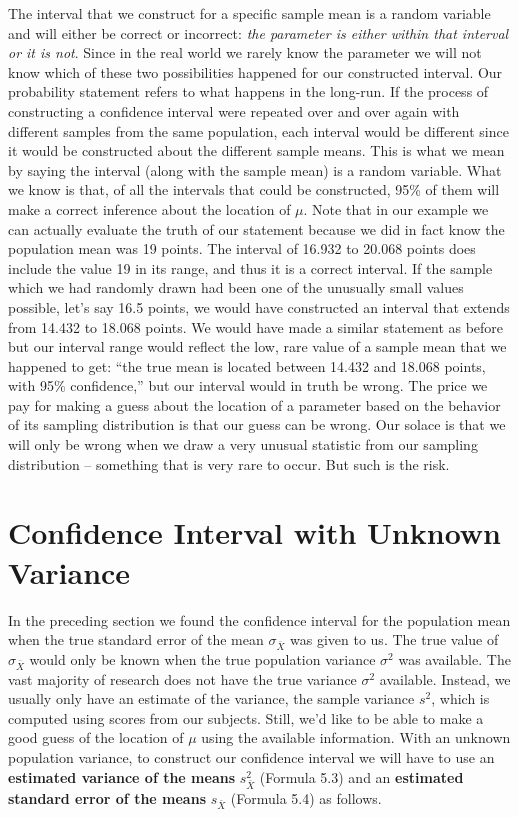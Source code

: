 \documentclass[12pt]{article}
\begin{document}
The interval that we construct for a specific sample mean is a random variable and
will either be correct or incorrect: \textit{the parameter is either within that interval or it is not}.
Since in the real world we rarely know the parameter we will not know which of these two
possibilities happened for our constructed interval. Our probability statement refers to
what happens in the long-run. If the process of constructing a confidence interval were
repeated over and over again with different samples from the same population, each
interval would be different since it would be constructed about the different sample means.
This is what we mean by saying the interval (along with the sample mean) is a random
variable. What we know is that, of all the intervals that could be constructed, 95\% of them
will make a correct inference about the location of $\mu$. Note that in our example we can
actually evaluate the truth of our statement because we did in fact know the population
mean was 19 points. The interval of 16.932 to 20.068 points does include the value 19 in its
range, and thus it is a correct interval. If the sample which we had randomly drawn had
been one of the unusually small values possible, let's say 16.5 points, we would have
constructed an interval that extends from 14.432 to 18.068 points. We would have made a
similar statement as before but our interval range would reflect the low, rare value of a
sample mean that we happened to get: ``the true mean is located between 14.432 and
18.068 points, with 95\% confidence,'' but our interval would in truth be wrong. The price
we pay for making a guess about the location of a parameter based on the behavior of its
sampling distribution is that our guess can be wrong. Our solace is that we will only be
wrong when we draw a very unusual statistic from our sampling distribution -- something
that is very rare to occur. But such is the risk.

\section*{Confidence Interval with Unknown Variance}

In the preceding section we found the confidence interval for the population mean
when the true standard error of the mean $\sigma_{\bar{X}}$ was given to us. The true value of $\sigma_{\bar{X}}$ would
only be known when the true population variance $\sigma^2$ was available. The vast majority of
research does not have the true variance $\sigma^2$ available. Instead, we usually only have an
estimate of the variance, the sample variance $s^2$, which is computed using scores from our
subjects. Still, we'd like to be able to make a good guess of the location of $\mu$ using the
available information. With an unknown population variance, to construct our confidence
interval we will have to use an \textbf{estimated variance of the means} $s_{\bar{X}}^2$ (Formula 5.3) and an
\textbf{estimated standard error of the means} $s_{\bar{X}}$ (Formula 5.4) as follows.
\end{document}
